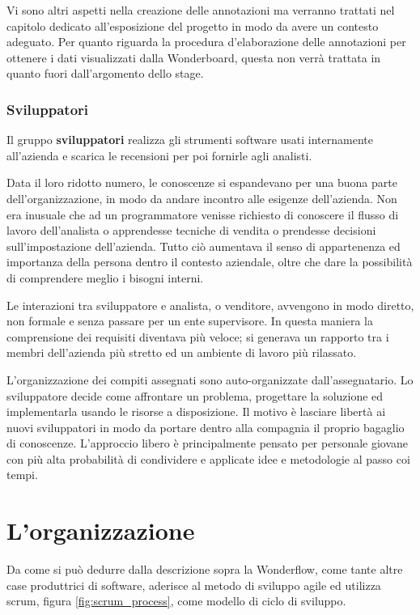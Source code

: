 Vi sono altri aspetti nella creazione delle annotazioni ma verranno trattati
nel capitolo dedicato all'esposizione del progetto in modo da avere un contesto
adeguato. Per quanto riguarda la procedura d'elaborazione delle annotazioni per
ottenere i dati visualizzati dalla Wonderboard, questa non verrà trattata in 
quanto fuori dall'argomento dello stage.

\subsubsection{Sviluppatori}
Il gruppo \textbf{sviluppatori} realizza gli strumenti software usati
internamente all'azienda e scarica le recensioni per poi fornirle agli analisti.

Data il loro ridotto numero, le conoscenze si espandevano per una buona parte
 dell'organizzazione, in modo da andare incontro alle esigenze dell'azienda.
Non era inusuale che ad un programmatore venisse richiesto di conoscere il 
flusso di lavoro dell'analista o apprendesse tecniche di vendita o prendesse 
decisioni sull'impostazione dell'azienda. Tutto ciò aumentava il senso di 
appartenenza ed importanza della persona dentro il contesto aziendale, oltre
che dare la possibilità di comprendere meglio i bisogni interni.

Le interazioni tra sviluppatore e analista, o venditore, avvengono in modo
diretto, non formale e senza passare per un ente supervisore. In questa maniera
la comprensione dei requisiti diventava più veloce; si generava un rapporto tra
i membri dell'azienda più stretto ed un ambiente di lavoro più rilassato.

L'organizzazione dei compiti assegnati sono auto-organizzate dall'assegnatario.
Lo sviluppatore decide come affrontare un problema, progettare la soluzione ed
implementarla usando le risorse a disposizione. Il motivo è lasciare libertà ai 
nuovi sviluppatori in modo da portare dentro alla compagnia il proprio bagaglio 
di conoscenze. L'approccio libero è principalmente pensato per personale 
giovane con più alta probabilità di condividere e applicate idee e metodologie 
al passo coi tempi.

\section{L'organizzazione}
Da come si può dedurre dalla descrizione sopra la Wonderflow, come tante altre
case produttrici di software, aderisce al metodo di sviluppo \gls{agile} ed 
utilizza \gls{scrum}, figura \ref{fig:scrum_process}, come modello di ciclo di 
sviluppo.

